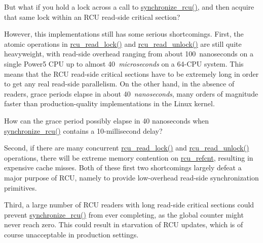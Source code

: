 \QuickQuiz{}
	But what if you hold a lock across a call to
	\url{synchronize_rcu()}, and then acquire that same lock within
	an RCU read-side critical section?
 \QuickQuizEnd

However, this implementations still has some serious shortcomings.
First, the atomic operations in \url{rcu_read_lock()} and
\url{rcu_read_unlock()} are still quite  heavyweight,
with read-side overhead ranging from about 100~nanoseconds on
a single Power5 CPU up to almost 40~\emph{microseconds}
on a 64-CPU system.
This means that the RCU read-side critical sections
have to be extremely long in order to get any real
read-side parallelism.
On the other hand, in the absence of readers, grace periods elapse
in about 40~\emph{nanoseconds}, many orders of magnitude faster
than production-quality implementations in the Linux kernel.

\QuickQuiz{}
	How can the grace period possibly elapse in 40 nanoseconds when
	\url{synchronize_rcu()} contains a 10-millisecond delay?
 \QuickQuizEnd

Second, if there are many concurrent \url{rcu_read_lock()}
and \url{rcu_read_unlock()} operations, there will
be extreme memory contention on \url{rcu_refcnt},
resulting in expensive cache misses.
Both of these first two shortcomings largely defeat a major purpose of
RCU, namely to provide low-overhead read-side synchronization primitives.

Third, a large number of RCU readers with long read-side
critical sections could prevent \url{synchronize_rcu()}
from ever completing, as the global counter might
never reach zero.
This could result in starvation of RCU updates, which
is of course unacceptable in production settings.

